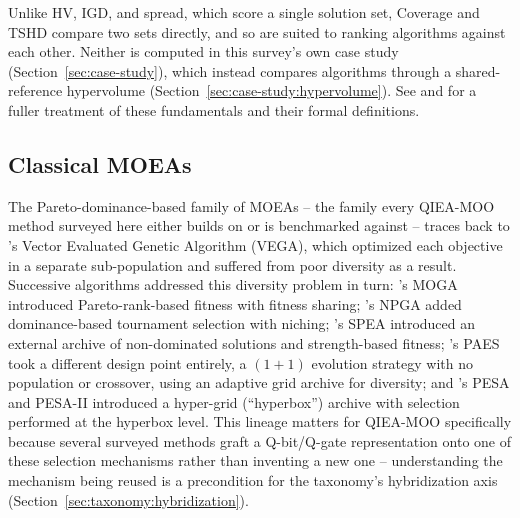 Unlike HV, IGD, and spread, which score a single solution set, Coverage
and TSHD compare two sets directly, and so are suited to ranking
algorithms against each other. Neither is computed in this survey's own
case study (Section~\ref{sec:case-study}), which instead compares
algorithms through a shared-reference hypervolume
(Section~\ref{sec:case-study:hypervolume}).
See \citet{emmerich2018tutorial} and \citet{hanne2025review} for a fuller
treatment of these fundamentals and their formal definitions.

\subsection{Classical MOEAs}
\label{sec:background:moea}

The Pareto-dominance-based family of MOEAs -- the family every QIEA-MOO
method surveyed here either builds on or is benchmarked against -- traces
back to \citet{schaffer1985vega}'s Vector Evaluated Genetic Algorithm
(VEGA), which optimized each objective in a separate sub-population and
suffered from poor diversity as a result. Successive algorithms
addressed this diversity problem in turn: \citet{fonseca1993moga}'s MOGA
introduced Pareto-rank-based fitness with fitness sharing;
\citet{horn1994npga}'s NPGA added dominance-based tournament selection
with niching; \citet{zitzler1999spea}'s SPEA introduced an external
archive of non-dominated solutions and strength-based fitness;
\citet{knowles2000paes}'s PAES took a different design point entirely,
a $(1+1)$ evolution strategy with no population or crossover, using an
adaptive grid archive for diversity; and
\citet{corne2000pesa,corne2001pesa2}'s PESA and PESA-II introduced a
hyper-grid (``hyperbox'') archive with selection performed at the
hyperbox level. This lineage matters for QIEA-MOO specifically because
several surveyed methods graft a Q-bit/Q-gate representation onto one of
these selection mechanisms rather than inventing a new one --
understanding the mechanism being reused is a precondition for the
taxonomy's hybridization axis (Section~\ref{sec:taxonomy:hybridization}).

